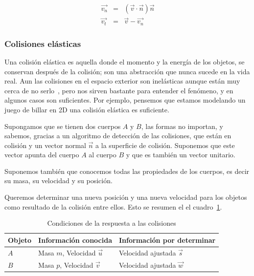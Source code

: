 \begin{eqnarray}
\vec{v_n} & = &(\vec{v} \cdot \vec{n}) \vec{n} \nonumber \\
\vec{v_t} & = & \vec{v} - \vec{v_n}
\label{eq:sepVector} 
\end{eqnarray}

\subsubsection{Colisiones elásticas}

Una colisión elástica es aquella donde el momento y la energía de los objetos, se conservan después de la colisión; son una abstracción que nunca sucede en la vida real. Aun las colisiones en el espacio exterior son inelásticas aunque están muy cerca de no serlo~\cite{FisicaMatematicasVideojuegos}, pero nos sirven bastante para entender el fenómeno, y en algunos casos son suficientes. Por ejemplo, pensemos que estamos modelando un juego de billar en 2D una colisión elástica es suficiente.

Supongamos que se tienen dos cuerpos $A$ y $B$, las formas no importan, y sabemos, gracias a un algoritmo de detección de las colisiones, que están en colisión y  un vector normal $\vec{n}$ a la superficie de colisión. Suponemos que este vector apunta del cuerpo $A$ al cuerpo $B$ y que es también un vector unitario.

Suponemos también que conocemos todas las propiedades de los cuerpos, es decir su masa, su velocidad y su posición.

Queremos determinar una nueva posición y una nueva velocidad para los objetos como resultado de la colisión entre ellos. Esto se resumen el el cuadro~\ref{condiciones:Colision}.

\begin{table}
\begin{center}
\begin{tabular} {@{}lll@{}}
\toprule
Objeto & Información conocida & Información por determinar \\
\midrule
$A$ & Masa $m$, Velocidad $\vec{u}$ & Velocidad ajustada $\vec{s}$ \\
$B$ & Masa $p$, Velocidad $\vec{v}$ & Velocidad ajustada $\vec{w}$ \\
\bottomrule
\end{tabular}
\end{center}
\caption{Condiciones de la respuesta a las colisiones}
\label{condiciones:Colision}
\end{table}

